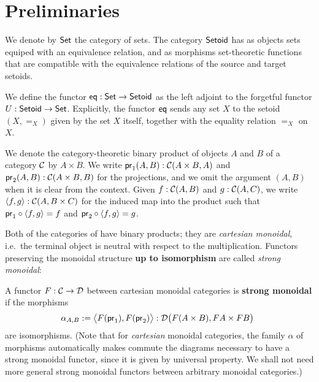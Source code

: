 \documentclass{amsart}
\newcommand{\fat}[1]{\textbf{#1}}
\begin{document}
\section{Preliminaries}\label{sec:preliminaries}


\begin{definition}\label{def:set_setoid}
 We denote by $\Set$ the category of sets. The category $\Setoid$ has as objects sets equiped with an equivalence relation,
 and as morphisms set-theoretic functions that are compatible with the equivalence relations of the source and target setoids.
\end{definition}



\begin{definition}\label{def:eq}
 We define the functor $\eq : \Set\to\Setoid$ as the left adjoint to the forgetful functor 
  $U : \Setoid \to \Set$.
  Explicitly, the functor $\eq$ sends any set $X$ to the setoid $(X,=_X)$ given by the set $X$ itself, together
  with the equality relation $=_X$ on $X$.
\end{definition}


\begin{remark}
  We denote the category-theoretic binary product of objects $A$ and $B$ of a category $\C$ by $A\times B$.
  We write $\pr_1(A,B) : \C(A\times B, A)$ and $\pr_2(A,B) :\C(A\times B, B)$ for the projections, and we omit the 
  argument $(A,B)$ when it is clear from the context.
  Given $f : \C(A, B)$ and $g : \C(A,C)$, we write $\langle f,g\rangle : \C(A,B\times C)$ for the induced map into the product such that
  $\comp{\langle f,g\rangle}{\pr_1} = f$ and $\comp{\langle f,g\rangle}{\pr_2} = g$.
\end{remark}

Both of the categories of  have binary products; they are \emph{cartesian monoidal}, i.e.\ the terminal 
object is neutral with respect to the multiplication. Functors preserving the monoidal structure \textbf{up to isomorphism}
are called \emph{strong monoidal}:

\begin{definition}\label{def:monoidal_functor}
 A functor $F:\C\to\D$ between cartesian monoidal categories is \fat{strong monoidal} if the morphisms
 \[ \alpha_{A,B} := \bigl\langle F(\pr_1), F(\pr_2) \bigr\rangle : \D\bigl(F(A\times B), FA\times FB\bigr)\enspace  \] 
 are isomorphisms.
 (Note that for \emph{cartesian} monoidal categories, the family $\alpha$ of morphisms automatically makes commute the 
  diagrams necessary to have a strong monoidal functor, since it is given by universal property. 
  We shall not need more general strong monoidal functors between arbitrary monoidal categories.)
\end{definition}
\end{document}
